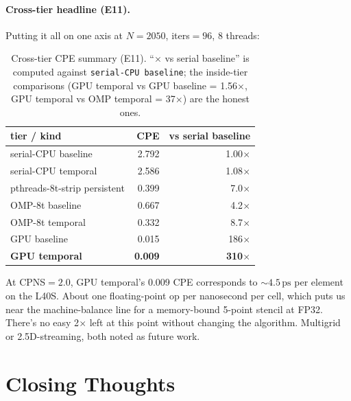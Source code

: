 \documentclass[11pt]{article}
\begin{document}
\paragraph{Cross-tier headline (E11).}  Putting it all on one axis at
$N{=}2050$, iters$=96$, 8 threads:

\begin{table}[h!]
\centering
\renewcommand{\arraystretch}{1.1}
\begin{tabular}{lrr}
\toprule
\textbf{tier / kind} & \textbf{CPE} & \textbf{vs serial baseline} \\
\midrule
serial-CPU baseline           & 2.792    & 1.00$\times$ \\
serial-CPU temporal           & 2.586    & 1.08$\times$ \\
pthreads-8t-strip persistent  & 0.399    & 7.0$\times$ \\
OMP-8t baseline               & 0.667    & 4.2$\times$ \\
OMP-8t temporal               & 0.332    & 8.7$\times$ \\
GPU baseline                  & 0.015    & 186$\times$ \\
\textbf{GPU temporal}         & \textbf{0.009} & \textbf{310$\times$} \\
\bottomrule
\end{tabular}
\caption{Cross-tier CPE summary (E11).  ``$\times$ vs serial
baseline'' is computed against \texttt{serial-CPU baseline}; the
inside-tier comparisons (GPU temporal vs GPU baseline = 1.56$\times$,
GPU temporal vs OMP temporal = 37$\times$) are the honest ones.}
\label{tab:headline}
\end{table}

\noindent At CPNS$=2.0$, GPU temporal's 0.009 CPE corresponds to
${\sim}4.5\,\text{ps}$ per element on the L40S. About one
floating-point op per nanosecond per cell, which puts us near the
machine-balance line for a memory-bound 5-point stencil at FP32.
There's no easy 2$\times$ left at this point without changing the
algorithm. Multigrid or 2.5D-streaming, both noted as future work.

\section{Closing Thoughts}
\label{sec:closing}
\end{document}
